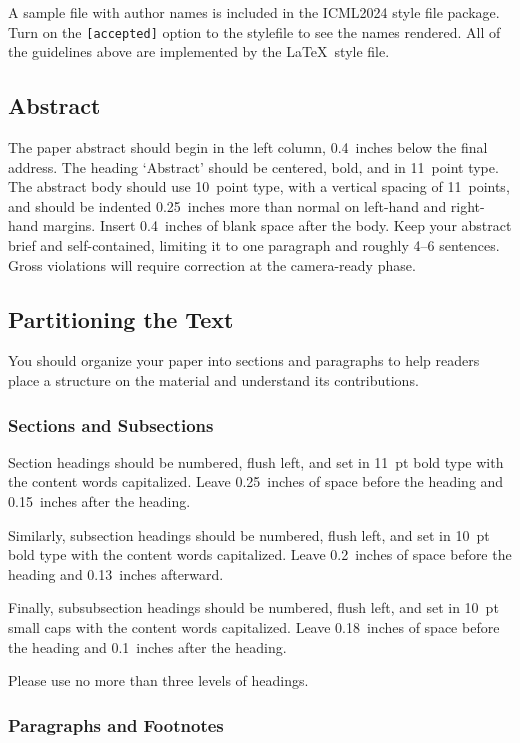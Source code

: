 \documentclass{article}
\theoremstyle{plain}
\theoremstyle{definition}
\theoremstyle{remark}
\begin{document}
A sample file with author names is included in the ICML2024 style file
package. Turn on the \texttt{[accepted]} option to the stylefile to
see the names rendered. All of the guidelines above are implemented
by the \LaTeX\ style file.

\subsection{Abstract}

The paper abstract should begin in the left column, 0.4~inches below the final
address. The heading `Abstract' should be centered, bold, and in 11~point type.
The abstract body should use 10~point type, with a vertical spacing of
11~points, and should be indented 0.25~inches more than normal on left-hand and
right-hand margins. Insert 0.4~inches of blank space after the body. Keep your
abstract brief and self-contained, limiting it to one paragraph and roughly 4--6
sentences. Gross violations will require correction at the camera-ready phase.

\subsection{Partitioning the Text}

You should organize your paper into sections and paragraphs to help
readers place a structure on the material and understand its
contributions.

\subsubsection{Sections and Subsections}

Section headings should be numbered, flush left, and set in 11~pt bold
type with the content words capitalized. Leave 0.25~inches of space
before the heading and 0.15~inches after the heading.

Similarly, subsection headings should be numbered, flush left, and set
in 10~pt bold type with the content words capitalized. Leave
0.2~inches of space before the heading and 0.13~inches afterward.

Finally, subsubsection headings should be numbered, flush left, and
set in 10~pt small caps with the content words capitalized. Leave
0.18~inches of space before the heading and 0.1~inches after the
heading.

Please use no more than three levels of headings.

\subsubsection{Paragraphs and Footnotes}
\end{document}
